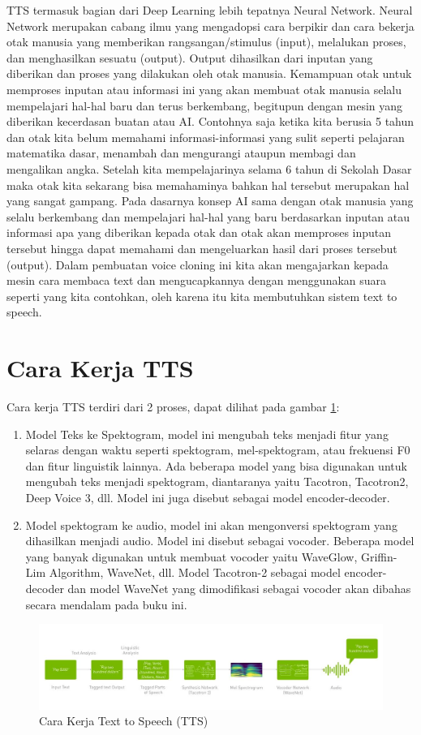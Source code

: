 TTS termasuk bagian dari Deep Learning lebih tepatnya Neural Network\cite{li2017deep}. Neural Network merupakan cabang ilmu yang mengadopsi cara berpikir dan cara bekerja otak manusia yang memberikan rangsangan/stimulus (input), melalukan proses, dan menghasilkan sesuatu (output). Output dihasilkan dari inputan yang diberikan dan proses yang dilakukan oleh otak manusia. Kemampuan otak untuk memproses inputan atau informasi ini yang akan membuat otak manusia selalu mempelajari hal-hal baru dan terus berkembang, begitupun dengan mesin yang diberikan kecerdasan buatan atau AI. Contohnya saja ketika kita berusia 5 tahun dan otak kita belum memahami informasi-informasi yang sulit seperti pelajaran matematika dasar, menambah dan mengurangi ataupun membagi dan mengalikan angka. Setelah kita mempelajarinya selama 6 tahun di Sekolah Dasar maka otak kita sekarang bisa memahaminya bahkan hal tersebut merupakan hal yang sangat gampang. Pada dasarnya konsep AI sama dengan otak manusia yang selalu berkembang dan mempelajari hal-hal yang baru berdasarkan inputan atau informasi apa yang diberikan kepada otak dan otak akan memproses inputan tersebut hingga dapat memahami dan mengeluarkan hasil dari proses tersebut (output).
Dalam pembuatan voice cloning ini kita akan mengajarkan kepada mesin cara membaca text dan mengucapkannya dengan menggunakan suara seperti yang kita contohkan, oleh karena itu kita membutuhkan sistem text to speech.


\section{Cara Kerja TTS}
Cara kerja TTS terdiri dari 2 proses, dapat dilihat pada gambar \ref{cara kerja}:
\begin{enumerate}
\item Model Teks ke Spektogram, model ini mengubah teks menjadi fitur yang selaras dengan waktu seperti spektogram, mel-spektogram, atau frekuensi F0 dan fitur linguistik lainnya. Ada beberapa model yang bisa digunakan untuk mengubah teks menjadi spektogram, diantaranya yaitu Tacotron, Tacotron2, Deep Voice 3, dll. Model ini juga disebut sebagai model encoder-decoder.
\item Model spektogram ke audio, model ini akan mengonversi spektogram yang dihasilkan menjadi audio. Model ini disebut sebagai vocoder. Beberapa model yang banyak digunakan untuk membuat vocoder yaitu WaveGlow, Griffin-Lim Algorithm, WaveNet, dll.
Model Tacotron-2 sebagai model encoder-decoder dan model WaveNet yang dimodifikasi sebagai vocoder akan dibahas secara mendalam pada buku ini.
\end{enumerate}
\begin{figure}[H]
        \centerline{\includegraphics[scale=.40]{figures/cara_kerja_tts}}
        \caption{Cara Kerja Text to Speech (TTS)}
		\label{cara kerja}
\end{figure}
